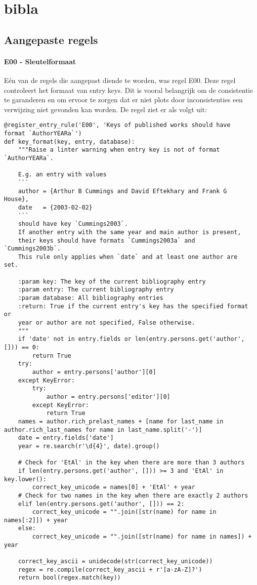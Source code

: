\section{bibla}
\subsection{Aangepaste regels}
\paragraph{E00 - Sleutelformaat}
\label{rule:E00}
Eén van de regels die aangepast diende te worden, was regel E00. Deze regel controleert het formaat van entry keys. Dit is vooral belangrijk om de consistentie te garanderen en om ervoor te zorgen dat er niet plots door inconsistenties een verwijzing niet gevonden kan worden. De regel ziet er als volgt uit:

\begin{verbatim}
@register_entry_rule('E00', 'Keys of published works should have format `AuthorYEARa`')
def key_format(key, entry, database):
    """Raise a linter warning when entry key is not of format `AuthorYEARa`.

    E.g. an entry with values
    ```
    author = {Arthur B Cummings and David Eftekhary and Frank G House},
    date   = {2003-02-02}
    ```
    should have key `Cummings2003`.
    If another entry with the same year and main author is present,
    their keys should have formats `Cummings2003a` and `Cummings2003b`.
    This rule only applies when `date` and at least one author are set.

    :param key: The key of the current bibliography entry
    :param entry: The current bibliography entry
    :param database: All bibliography entries
    :return: True if the current entry's key has the specified format or
    year or author are not specified, False otherwise.
    """
    if 'date' not in entry.fields or len(entry.persons.get('author', [])) == 0:
        return True
    try:
        author = entry.persons['author'][0]
    except KeyError:
        try:
            author = entry.persons['editor'][0]
        except KeyError:
            return True
    names = author.rich_prelast_names + [name for last_name in author.rich_last_names for name in last_name.split('-')]
    date = entry.fields['date']
    year = re.search(r'\d{4}', date).group()

    # Check for 'EtAl' in the key when there are more than 3 authors
    if len(entry.persons.get('author', [])) >= 3 and 'EtAl' in key.lower():
        correct_key_unicode = names[0] + 'EtAl' + year
    # Check for two names in the key when there are exactly 2 authors
    elif len(entry.persons.get('author', [])) == 2:
        correct_key_unicode = "".join([str(name) for name in names[:2]]) + year
    else:
        correct_key_unicode = "".join([str(name) for name in names]) + year

    correct_key_ascii = unidecode(str(correct_key_unicode))
    regex = re.compile(correct_key_ascii + r'[a-zA-Z]?')
    return bool(regex.match(key))
\end{verbatim}

